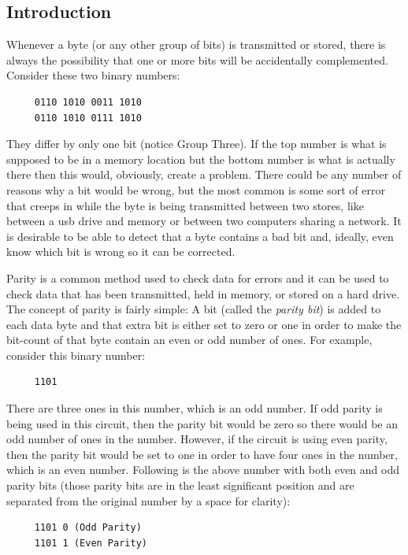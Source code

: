 \subsection{Introduction}
\label{CL:subsec:introduction_to_error_detection}

Whenever a byte (or any other group of bits) is transmitted or stored, there is always the possibility that one or more bits will be accidentally complemented. Consider these two binary numbers:

\begin{verbatim}
     0110 1010 0011 1010
     0110 1010 0111 1010
\end{verbatim} 

They differ by only one bit (notice Group Three). If the top number is what is supposed to be in a memory location but the bottom number is what is actually there then this would, obviously, create a problem. There could be any number of reasons why a bit would be wrong, but the most common is some sort of error that creeps in while the byte is being transmitted between two stores, like between a \gls{usb} drive and memory or between two computers sharing a network. It is desirable to be able to detect that a byte contains a bad bit and, ideally, even know which bit is wrong so it can be corrected. 

Parity is a common method used to check data for errors and it can be used to check data that has been transmitted, held in memory, or stored on a hard drive. The concept of parity is fairly simple: A bit (called the \emph{parity bit}) is added to each data byte and that extra bit is either set to zero or one in order to make the bit-count of that byte contain an even or odd number of ones. For example, consider this binary number: 

\begin{verbatim}
     1101
\end{verbatim}

There are three ones in this number, which is an odd number. If odd parity is being used in this circuit, then the parity bit would be zero so there would be an odd number of ones in the number. However, if the circuit is using even parity, then the parity bit would be set to one in order to have four ones in the number, which is an even number. Following is the above number with both even and odd parity bits (those parity bits are in the least significant position and are separated from the original number by a space for clarity): 

\begin{verbatim}
     1101 0 (Odd Parity)
     1101 1 (Even Parity)
\end{verbatim}


